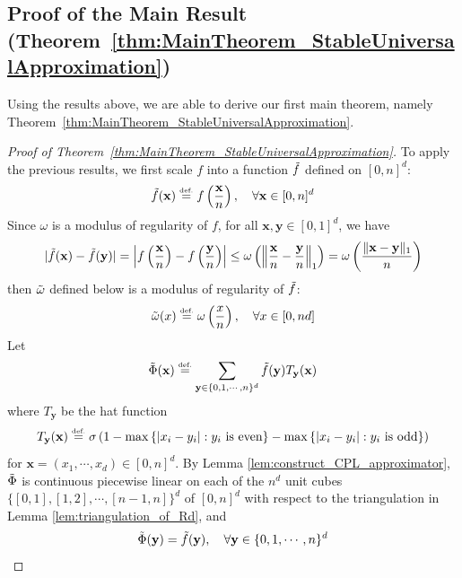 \documentclass{article}
\numberwithin{equation}{section}
\theoremstyle{definition}
\newcommand{\eqdef}{\ensuremath{\stackrel{\mbox{\upshape\tiny def.}}{=}}}
\begin{document}
\subsection{{Proof of the Main Result (Theorem~\ref{thm:MainTheorem_StableUniversalApproximation})}}
\label{s:Compute__ss:MainResult}
Using the results above, we are able to derive our first main theorem, namely Theorem~\ref{thm:MainTheorem_StableUniversalApproximation}.  

\begin{proof}[{Proof of Theorem~\ref{thm:MainTheorem_StableUniversalApproximation}}]
To apply the previous results, we first scale $f$ into a function $\Tilde{f}$ defined on $[0,n]^d$: 
\begin{equation}
\label{eq:rescalingdomain}
\Tilde{f}(\mathbf{x})  \eqdef  f\left(\frac{\mathbf{x}}{n}\right), \quad 
\forall \mathbf{x}\in[0,n]^d
\end{equation}
Since $\omega$ is a modulus of regularity of $f$, for all $\mathbf{x},\mathbf{y}\in[0,1]^d$, we have 
$$|\Tilde{f}(\mathbf{x}) - \Tilde{f}(\mathbf{y})| 
= \left|
      f\left(\frac{\mathbf{x}}{n}\right) 
      - 
      f\left(\frac{\mathbf{y}}{n}\right)
  \right|
\le \omega\left( 
        \left\| 
            \frac{\mathbf{x}}{n} - \frac{\mathbf{y}}{n} 
        \right\|_1 
    \right)
=   \omega\left( 
        \frac{\|\mathbf{x} - \mathbf{y}\|_1}{n}
    \right)$$
then $\Tilde{\omega}$ defined below is a modulus of regularity of $\Tilde{f}$: 
$$\Tilde{\omega}(x)  \eqdef  \omega\left(\frac{x}{n}\right), \quad 
\forall x\in[0,nd]$$
Let
$$\Tilde{\Phi}(\mathbf{x})  \eqdef  
    \sum_{
    \mathbf{y}\in\{0,1,\cdots,n\}^d
    }
    \Tilde{f}(\mathbf{y})
    T_{\mathbf{y}}(\mathbf{x})
$$
where $T_{\mathbf{y}}$ be the hat function 
$$T_{\mathbf{y}}(\mathbf{x}) \eqdef 
\sigma
    \left(
        1 - 
        \max
        \left\{
            | x_i - y_i | :
            y_i \text{ is even}
        \right\}
        -
        \max
        \left\{
            | x_i - y_i | :
            y_i \text{ is odd}
        \right\}
    \right)$$
for $\mathbf{x} = (x_1,\cdots,x_d) \in [0,n]^d$. By Lemma \ref{lem:construct_CPL_approximator}, $\Tilde{\Phi}$ is continuous piecewise linear on each of the $n^d$ unit cubes $\{[0,1],[1,2],\cdots,[n-1,n]\}^d$ of $[0,n]^d$ with respect to the triangulation in Lemma \ref{lem:triangulation_of_Rd}, and
\begin{equation}
\label{eq:interpolation}
\Tilde{\Phi}(\mathbf{y}) = \Tilde{f}(\mathbf{y}), \quad
\forall \mathbf{y} \in\{0,1,\cdots,n\}^d
\end{equation}

\end{proof}
\end{document}
